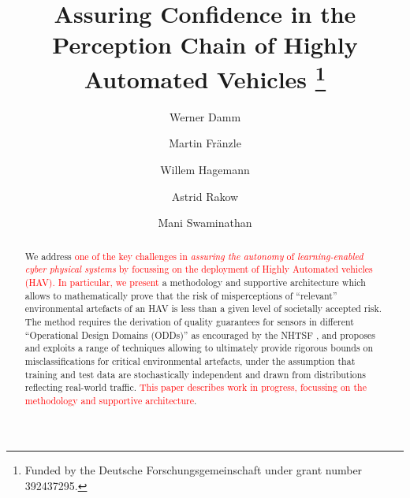 \documentclass[runningheads]{llncs}
\begin{document}
%
\title{Assuring Confidence in the Perception Chain of Highly Automated Vehicles
\thanks{Funded by the Deutsche Forschungsgemeinschaft under grant number 392437295.}}
%
%
\author{Werner Damm \and
Martin Fr\"anzle  \and
Willem Hagemann  \and
Astrid Rakow  \and
Mani Swaminathan }
%
%
%
\maketitle              %
%
\begin{abstract}
We address \textcolor{red}{one of the key challenges in \emph{assuring the autonomy} of \emph{learning-enabled cyber physical systems} by focussing on the deployment of Highly Automated vehicles (HAV). In particular, we present} a methodology and supportive architecture which allows to mathematically prove that the risk of misperceptions of \enquote{relevant} environmental artefacts of an HAV is less than a given level of societally accepted risk. The method requires the derivation of quality guarantees for sensors in different \enquote{Operational Design Domains (ODDs)}  as encouraged by the NHTSF \cite{NHTSF}, and proposes and exploits a range of techniques allowing to ultimately provide rigorous bounds on misclassifications for critical environmental artefacts, under the assumption that training and test data are stochastically independent and drawn from distributions reflecting real-world traffic. \textcolor{red}{This paper describes work in progress, focussing on the methodology and supportive architecture}.
\end{abstract}
%
%









\end{document}
